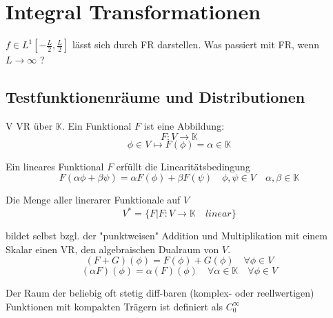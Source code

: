 \section{Integral Transformationen}
    $f \in L^1[-\frac{L}{2}, \frac{L}{2}]$ lässt sich durch
    FR darstellen. Was passiert mit FR, wenn 
    $L \rightarrow \infty$ ?


    \subsection{Testfunktionenräume und Distributionen}

    \begin{Def}
        V VR über $\mathbb{K}$. Ein Funktional $F$ ist eine Abbildung:
        $$F: V \rightarrow \mathbb{K}$$
        $$ \phi \in V \mapsto F(\phi) = \alpha \in \mathbb{K}$$

        Ein lineares Funktional $F$ erfüllt die Linearitätsbedingung
        $$F(\alpha \phi + \beta \psi) = \alpha F(\phi) + \beta F(\psi) \quad \phi , \psi \in V \quad \alpha, \beta \in \mathbb{K} $$

        Die Menge aller linerarer Funktionale auf $V$
        $$V^\ast =  \{ F | F:V \rightarrow \mathbb{K} \quad linear \} $$

        bildet selbst bzgl. der "punktweisen" Addition und Multiplikation
        mit einem Skalar einen VR, den algebraischen Dualraum von $V$.
        $$(F+G)(\phi) = F(\phi) + G(\phi) \quad \forall \phi \in V $$
        $$(\alpha F)(\phi) = \alpha (F)(\phi)  \quad \forall \alpha \in \mathbb{K} \quad \forall \phi \in V $$
    \end{Def}

    \begin{Def}
        Der Raum der beliebig oft stetig diff-baren (komplex- oder 
        reellwertigen) Funktionen mit kompakten Trägern ist definiert als
        $C_0^\infty$
    \end{Def}
